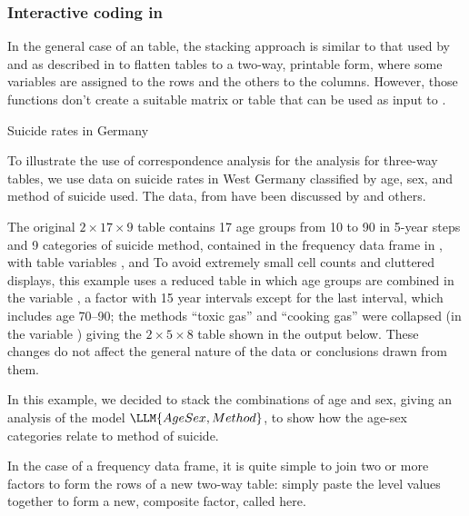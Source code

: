 \documentclass[11pt]{book}\usepackage[]{graphicx}\usepackage[]{color}
\begin{document}
\subsubsection{Interactive coding in \R}
In the general case of an \nway table, the stacking approach
is similar to that used by  and 
as described in  to flatten \mway tables to a two-way,
printable form, where some variables are assigned to the rows and the
others to the columns. However, those functions don't create a suitable
matrix or table that can be used as input to .


\begin{Example}[suicide1]{Suicide rates in Germany}

To illustrate the use of correspondence analysis for the analysis for
three-way tables, we use data on suicide rates in West Germany
classified by age, sex, and method of suicide used.  The data, from
\citet[Table 1]{Heuer:79}
have been discussed by
\citet{Friendly:91,Friendly:94a,HeijdenLeeuw:85}
and others.

The original \(2
\times  17 \times  9\) table contains 17 age groups from 10 to 90 in
5-year steps and 9 categories of suicide method, contained in the
frequency data frame  in , with
table variables ,  and 
To avoid extremely
small cell counts and cluttered displays,
this example uses a reduced table in which age
groups are combined in the variable , a factor
with 15 year intervals except for the last
interval, which includes age 70--90; 
the methods ``toxic gas'' and
``cooking gas'' were collapsed (in the variable )
giving the \(2 \times  5 \times  8\) table shown 
in the output below.
These changes do not affect the general
nature of the data or conclusions drawn from them.

In this example, we decided to stack the combinations of
age and sex, giving an analysis of the \loglin model
$\LLM{AgeSex, Method}$, to show how the age-sex categories
relate to method of suicide.

In the case of a frequency data frame, it is quite simple to
join two or more factors to form the rows of a new two-way table:
simply paste the level values together to form a new, composite
factor, called  here.


\end{Example}
\end{document}
